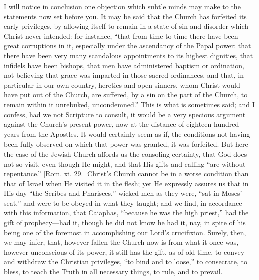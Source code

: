 I will notice in conclusion one objection which subtle minds may
make to the statements now set before you. It may be said that the
Church has forfeited its early privileges, by allowing itself to
remain in a state of sin and disorder which Christ never intended: for
instance, ``that from time to time there have been great
corruptions in it, especially under the ascendancy of the Papal power:
that there have been very many scandalous appointments to its highest
dignities, that infidels have been bishops, that men have administered
baptism or ordination, not believing that grace was imparted in those
sacred ordinances, and that, in particular in our own country,
heretics and open sinners, whom Christ would have put out of the
Church, are suffered, by a sin on the part of the Church, to remain
within it unrebuked, uncondemned.'' This is what is sometimes
said; and I confess, had we not Scripture to consult, it would be a
very specious argument against the Church's present power, now at the
distance of eighteen hundred years from the Apostles. It would
certainly seem as if, the conditions not having been fully observed on
which that power was granted, it was forfeited. But here the case of
the Jewish Church affords us the consoling certainty, that God does
not so visit, even though He might, and that His gifts and calling
``are without repentance.'' [Rom. xi. 29.] Christ's Church
cannot be in a worse condition than that of Israel when He visited it
in the flesh; yet He expressly assures us that in His day ``the
Scribes and Pharisees,'' wicked men as they were, ``sat in
Moses' seat,'' and were to be obeyed in what they taught; and we
find, in accordance with this information, that Caiaphas,
``because he was the high priest,'' had the gift of prophecy—had
it, though he did not know he had it, nay, in spite of his being one
of the foremost in accomplishing our Lord's crucifixion. Surely, then,
we may infer, that, however fallen the Church now is from what it once
was, however unconscious of its power, it still has the gift, as of
old time, to convey and withdraw the Christian privileges, ``to
bind and to loose,'' to consecrate, to bless, to teach the Truth
in all necessary things, to rule, and to prevail.

